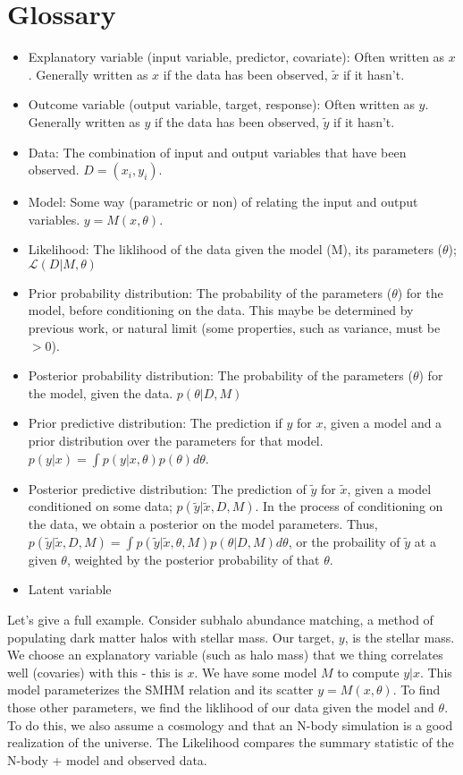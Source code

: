 \documentclass{article}
\begin{document}
\section{Glossary}
\begin{itemize}
    \item Explanatory variable (input variable, predictor, covariate): Often written as $x$. Generally written as $x$ if the data has been observed, $\tilde{x}$ if it hasn't.
    \item Outcome variable (output variable, target, response): Often written as $y$. Generally written as $y$ if the data has been observed, $\tilde{y}$ if it hasn't.
    \item Data: The combination of input and output variables that have been observed. $D = {(x_i, y_i)}$.
    \item Model: Some way (parametric or non) of relating the input and output variables. $y = M(x, \theta)$.
    \item Likelihood: The liklihood of the data given the model (M), its parameters ($\theta$); $\mathcal{L}(D | M, \theta)$
    \item Prior probability distribution: The probability of the parameters ($\theta$) for the model, before conditioning on the data. This maybe be determined by previous work, or natural limit (some properties, such as variance, must be $> 0$).
    \item Posterior probability distribution: The probability of the parameters ($\theta$) for the model, given the data. $p(\theta | D, M)$
    \item Prior predictive distribution: The prediction if $y$ for $x$, given a model and a prior distribution over the parameters for that model. $p(y | x) = \int p(y | x, \theta) p(\theta) d\theta$.
    \item Posterior predictive distribution: The prediction of $\tilde{y}$ for $\tilde{x}$, given a model conditioned on some data; $p(\tilde{y} | \tilde{x}, D, M)$. In the process of conditioning on the data, we obtain a posterior on the model parameters. Thus, $p(\tilde{y} | \tilde{x}, D, M) = \int p(\tilde{y} | \tilde{x}, \theta, M) p(\theta | D, M) d\theta$, or the probaility of $\tilde{y}$ at a given $\theta$, weighted by the posterior probability of that $\theta$.
    \item Latent variable
\end{itemize}

Let's give a full example. Consider subhalo abundance matching, a method of populating dark matter halos with stellar mass. Our target, $y$, is the stellar mass. We choose an explanatory variable (such as halo mass) that we thing correlates well (covaries) with this - this is $x$.
We have some model $M$ to compute $y | x$. This model parameterizes the SMHM relation and its scatter $y = M(x, \theta)$.
To find those other parameters, we find the liklihood of our data given the model and $\theta$. To do this, we also assume a cosmology and that an N-body simulation is a good realization of the universe. The Likelihood compares the summary statistic of the N-body + model and observed data.
\end{document}
